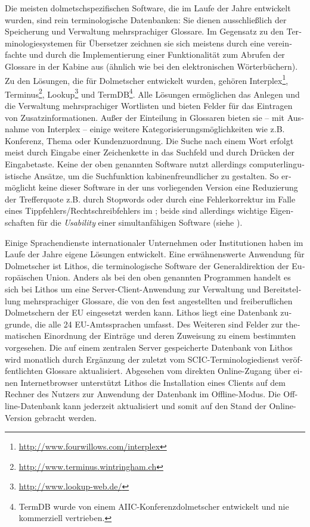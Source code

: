 \documentclass[output=paper]{LSP/langsci}
\begin{document}
\begin{otherlanguage}{ngerman}
 
Die meisten dolmetschspezifischen Software, die im Laufe der Jahre entwickelt wurden, sind rein terminologische Datenbanken: Sie dienen ausschließlich der Speicherung und Verwaltung mehrsprachiger Glossare. Im Gegensatz zu den Terminologiesystemen für Übersetzer zeichnen sie sich meistens durch eine vereinfachte  und durch die Implementierung einer Funktionalität zum Abrufen der Glossare in der Kabine aus (ähnlich wie bei den elektronischen Wörterbüchern). Zu den Lösungen, die für Dolmetscher entwickelt wurden, gehören Interplex\footnote{\url{http://www.fourwillows.com/interplex}}, Terminus\footnote{\url{http://www.terminus.wintringham.ch}}, Lookup\footnote{\url{http://www.lookup-web.de/}} und TermDB\footnote{ TermDB wurde von einem AIIC-Konferenzdolmetscher entwickelt und nie kommerziell vertrieben.}. Alle Lösungen ermöglichen das Anlegen und die Verwaltung mehrsprachiger Wortlisten und bieten Felder für das Eintragen von Zusatzinformationen. Außer der Einteilung in Glossaren bieten sie -- mit Ausnahme von Interplex -- einige weitere Kategorisierungsmöglichkeiten wie z.B. Konferenz, Thema oder Kundenzuordnung. Die Suche nach einem Wort erfolgt meist durch Eingabe einer Zeichenkette in das Suchfeld und durch Drücken der Eingabetaste. Keine der oben genannten Software nutzt allerdings computerlinguistische Ansätze, um die Suchfunktion kabinenfreundlicher zu gestalten. So ermöglicht keine dieser Software in der uns vorliegenden Version eine Reduzierung der Trefferquote z.B. durch Stopwords oder durch eine Fehlerkorrektur im Falle eines Tippfehlers/Rechtschreibfehlers im ; beide sind allerdings wichtige Eigenschaften für die \textit{Usability} einer simultanfähigen Software (siehe ).

Einige Sprachendienste internationaler Unternehmen oder Institutionen haben im Laufe der Jahre eigene Lösungen entwickelt. Eine erwähnenswerte Anwendung für Dolmetscher ist Lithos, die terminologische Software der Generaldirektion  der Europäischen Union. Anders als bei den oben genannten Programmen handelt es sich bei Lithos um eine Server-Client-Anwendung zur Verwaltung und Bereitstellung mehrsprachiger Glossare, die von den fest angestellten und freiberuflichen Dolmetschern der EU eingesetzt werden kann. Lithos liegt eine Datenbank zugrunde, die alle 24 EU-Amtssprachen umfasst. Des Weiteren sind Felder zur thematischen Einordnung der Einträge und deren Zuweisung zu einem bestimmten  vorgesehen. Die auf einem zentralen Server gespeicherte Datenbank von Lithos wird monatlich durch Ergänzung der zuletzt vom SCIC-Terminologiedienst veröffentlichten Glossare aktualisiert. Abgesehen vom direkten Online-Zugang über einen Internetbrowser unterstützt Lithos die Installation eines Clients auf dem Rechner des Nutzers zur Anwendung der Datenbank im Offline-Modus. Die Offline-Datenbank kann jederzeit aktualisiert und somit auf den Stand der Online-Version gebracht werden.


\end{otherlanguage}
\end{document}
